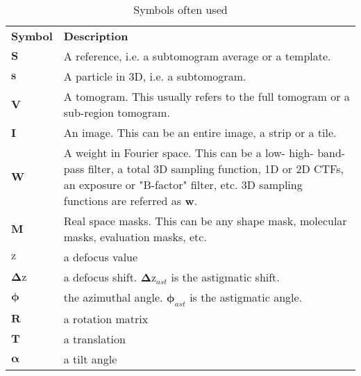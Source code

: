 \begin{longtable}[c]{| l || p{120mm} |}
\captionsetup{labelfont=bf}
\caption{Symbols often used} \label{tab:symbols}\\

\hline
\textbf{Symbol} & \textbf{Description}\\ \hhline{|=#=|}
$\bm{S}$ & A reference, i.e. a subtomogram average or a template.\\ \hline
$\bm{s}$ & A particle in 3D, i.e. a subtomogram.\\ \hhline{|=#=|}

$\bm{V}$ & A tomogram. This usually refers to the full tomogram or a sub-region tomogram.\\ \hline
$\bm{I}$ & An image. This can be an entire image, a strip or a tile.\\ \hhline{|=#=|}

$\bm{W}$ & A weight in Fourier space. This can be a low- high- band-pass filter, a total 3D sampling function, 1D or 2D CTFs, an exposure or "B-factor" filter, etc. 3D sampling functions are referred as $\bm{w}$.\\ \hline
$\bm{M}$ & Real space masks. This can be any shape mask, molecular masks, evaluation masks, etc.\\ \hhline{|=#=|}

$\bm{\mathrm{z}}$ & a defocus value\\ \hline
$\bm{\Delta \mathrm{z}}$ & a defocus shift. $\bm{\Delta \mathrm{z}}_{ast}$ is the astigmatic shift.\\ \hline
$\bm{\phi}$ & the azimuthal angle. $\bm{\phi}_{ast}$ is the astigmatic angle.\\ \hhline{|=#=|}

$\bm{R}$ & a rotation matrix\\ \hline
$\bm{T}$ & a translation\\ \hline
$\bm{\alpha}$ & a tilt angle\\ \hline

\end{longtable}